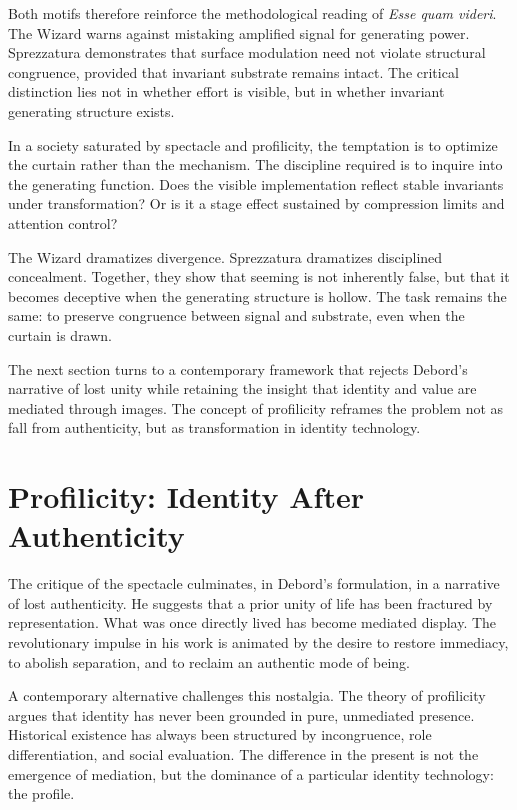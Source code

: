 \documentclass[11pt]{article}
\begin{document}
Both motifs therefore reinforce the methodological reading of \textit{Esse quam videri}. The Wizard warns against mistaking amplified signal for generating power. Sprezzatura demonstrates that surface modulation need not violate structural congruence, provided that invariant substrate remains intact. The critical distinction lies not in whether effort is visible, but in whether invariant generating structure exists.

In a society saturated by spectacle and profilicity, the temptation is to optimize the curtain rather than the mechanism. The discipline required is to inquire into the generating function. Does the visible implementation reflect stable invariants under transformation? Or is it a stage effect sustained by compression limits and attention control?

The Wizard dramatizes divergence. Sprezzatura dramatizes disciplined concealment. Together, they show that seeming is not inherently false, but that it becomes deceptive when the generating structure is hollow. The task remains the same: to preserve congruence between signal and substrate, even when the curtain is drawn.

The next section turns to a contemporary framework that rejects Debord’s narrative of lost unity while retaining the insight that identity and value are mediated through images. The concept of profilicity reframes the problem not as fall from authenticity, but as transformation in identity technology.

\section{Profilicity: Identity After Authenticity}

The critique of the spectacle culminates, in Debord’s formulation, in a narrative of lost authenticity. He suggests that a prior unity of life has been fractured by representation. What was once directly lived has become mediated display. The revolutionary impulse in his work is animated by the desire to restore immediacy, to abolish separation, and to reclaim an authentic mode of being.

A contemporary alternative challenges this nostalgia. The theory of profilicity argues that identity has never been grounded in pure, unmediated presence. Historical existence has always been structured by incongruence, role differentiation, and social evaluation. The difference in the present is not the emergence of mediation, but the dominance of a particular identity technology: the profile.
\end{document}
